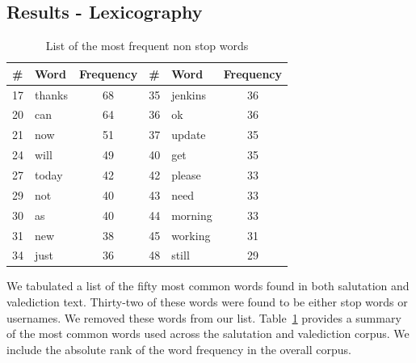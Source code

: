 \subsection{Results - Lexicography}

\begin {table}[]
\caption {List of the most frequent non stop words} 
\label{tab:chap7_study2_tab7}
\begin{center}
\begin{tabular}{| p{1cm} | p{2cm} | p{2cm} | p{1cm} | p{2cm} | p{2cm} |} 
\hline \textbf{\#} & \textbf{Word} & \textbf{Frequency} & \textbf{\#} & \textbf{Word} & \textbf{Frequency}
\\  \hline 17 & thanks &\multicolumn{0}{|c|}{68} & 35 & jenkins &\multicolumn{0}{|c|}{36}
\\  \hline 20 & can & \multicolumn{0}{|c|}{64} & 36 & ok &\multicolumn{0}{|c|}{36}
\\ \hline 21 & now & \multicolumn{0}{|c|}{51} & 37 & update &\multicolumn{0}{|c|}{35}
\\  \hline 24 & will & \multicolumn{0}{|c|}{49} & 40 & get &\multicolumn{0}{|c|}{35}
\\  \hline 27 & today & \multicolumn{0}{|c|}{42} & 42 & please &\multicolumn{0}{|c|}{33}
\\  \hline 29 & not & \multicolumn{0}{|c|}{40} & 43 & need &\multicolumn{0}{|c|}{33}
\\  \hline 30 & as & \multicolumn{0}{|c|}{40} & 44 & morning &\multicolumn{0}{|c|}{33}
\\  \hline 31 & new & \multicolumn{0}{|c|}{38} & 45 & working &\multicolumn{0}{|c|}{31}
\\  \hline 34 & just & \multicolumn{0}{|c|}{36} & 48 & still &\multicolumn{0}{|c|}{29}
\\ \hline
\end{tabular}
\end{center}
\end{table}

We tabulated a list of the fifty most common words found in both salutation and valediction text. Thirty-two of these words were found to be either stop words or usernames. We removed these words from our list. Table~\ref{tab:chap7_study2_tab7} provides a summary of the most common words used across the salutation and valediction corpus. We include the absolute rank of the word frequency in the overall corpus. 


